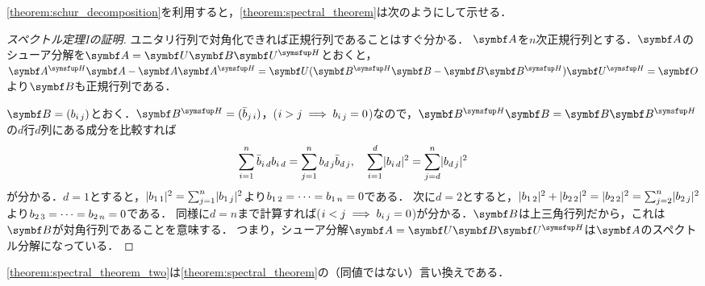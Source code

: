 \documentclass[../../main]{subfiles}
\begin{document}
\cref{theorem:schur_decomposition}を利用すると，\cref{theorem:spectral_theorem}は次のようにして示せる．

\begin{proof}[スペクトル定理Iの証明]
  ユニタリ行列で対角化できれば正規行列であることはすぐ分かる．
  \(\mat{A}\)を\(n\)次正規行列とする．\(\mat{A}\)のシューア分解を\(\mat{A}=\mat{U}\mat{B}\htrps{\mat{U}}\)とおくと，
  \(\htrps{\mat{A}}\mat{A}-\mat{A}\htrps{\mat{A}}=\mat{U}(\htrps{\mat{B}}\mat{B}-\mat{B}\htrps{\mat{B}})\htrps{\mat{U}}=\zmat\)より\(\mat{B}\)も正規行列である．

  \(\mat{B}=\matfence{\midx{b}{i}{j}}\)とおく．\(\htrps{\mat{B}}=\matfence{\midx{\conj{b}}{j}{i}}\)，(\(i>j\implies b_{i\,j}=0\))なので，\(\htrps{\mat{B}}\mat{B}=\mat{B}\htrps{\mat{B}}\)の\(d\)行\(d\)列にある成分を比較すれば
  \[
    \sum_{i=1}^n\midx{\conj{b}}{i}{d}\midx{b}{i}{d} = \sum_{j=1}^n\midx{b}{d}{j}\midx{\conj{b}}{d}{j},
    \quad\sum_{i=1}^d\abs{\midx{b}{i}{d}}^2 = \sum_{j=d}^n\abs{\midx{b}{d}{j}}^2
  \]
  が分かる．\(d=1\)とすると，\(\lvert b_{1\,1}\rvert^2=\sum_{j=1}^n\lvert b_{1\,j}\rvert^2\)より\(b_{1\,2}=\dots=b_{1\,n}=0\)である．
  次に\(d=2\)とすると，\(\lvert b_{1\,2}\rvert^2+\lvert b_{2\,2}\rvert^2=\lvert b_{2\,2}\rvert^2=\sum_{j=2}^n\lvert b_{2\,j}\rvert^2\)より\(b_{2\,3}=\dots=b_{2\,n}=0\)である．
  同様に\(d=n\)まで計算すれば(\(i<j\implies b_{i\,j}=0\))が分かる．\(\mat{B}\)は上三角行列だから，これは\(\mat{B}\)が対角行列であることを意味する．
  つまり，シューア分解\(\mat{A}=\mat{U}\mat{B}\htrps{\mat{U}}\)は\(\mat{A}\)のスペクトル分解になっている．
\end{proof}

\cref{theorem:spectral_theorem_two}は\cref{theorem:spectral_theorem}の（同値ではない）言い換えである．
\end{document}
